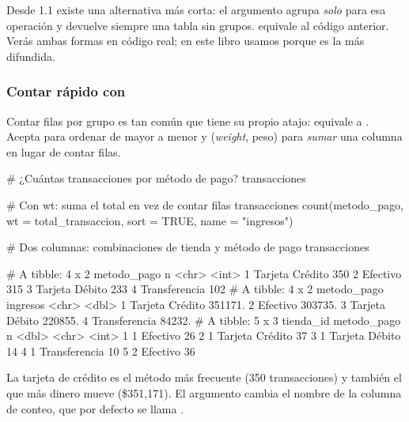 \begin{consejo}
Desde  1.1 existe una alternativa más corta: el argumento
 agrupa \emph{solo} para esa operación y devuelve siempre una
tabla sin grupos.  equivale al código anterior. Verás ambas formas
en código real; en este libro usamos  porque es la más
difundida.
\end{consejo}

\subsubsection{Contar rápido con \texorpdfstring{}{count()}}

Contar filas por grupo es tan común que tiene su propio atajo:
 equivale a .
Acepta  para ordenar de mayor a menor y 
(\emph{weight}, peso) para \emph{sumar} una columna en lugar de contar filas.

\begin{rcode}
# ¿Cuántas transacciones por método de pago?
transacciones %

# Con wt: suma el total en vez de contar filas
transacciones %
  count(metodo_pago, wt = total_transaccion, sort = TRUE,
        name = "ingresos")

# Dos columnas: combinaciones de tienda y método de pago
transacciones %
\end{rcode}
\begin{rsalida}
# A tibble: 4 x 2
  metodo_pago         n
  <chr>           <int>
1 Tarjeta Crédito   350
2 Efectivo          315
3 Tarjeta Débito    233
4 Transferencia     102
# A tibble: 4 x 2
  metodo_pago     ingresos
  <chr>              <dbl>
1 Tarjeta Crédito  351171.
2 Efectivo         303735.
3 Tarjeta Débito   220855.
4 Transferencia     84232.
# A tibble: 5 x 3
  tienda_id metodo_pago         n
      <dbl> <chr>           <int>
1         1 Efectivo           26
2         1 Tarjeta Crédito    37
3         1 Tarjeta Débito     14
4         1 Transferencia      10
5         2 Efectivo           36
\end{rsalida}

La tarjeta de crédito es el método más frecuente (350 transacciones) y
también el que más dinero mueve (\$351,171). El argumento 
cambia el nombre de la columna de conteo, que por defecto se llama
.

